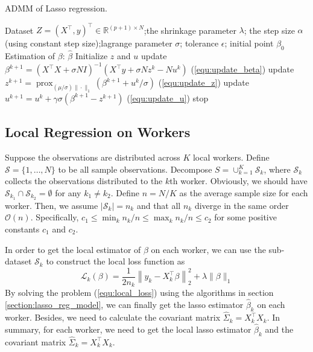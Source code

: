 \documentclass[11pt,en,authoryear]{elegantpaper}
\numberwithin{equation}{section}
\newcommand{\mbR}{\mathbb{R}}
\newcommand{\mS}{\mathcal{S}}
\begin{document}
\begin{center}
\begin{minipage}{13.5cm}
	  \begin{algorithm}[H]
  \caption{ADMM of Lasso regression.}\label{algo:admm_lasso}
  \begin{algorithmic}[1]
    \Require
      Dataset $Z = (X^{\top}, y)^{\top} \in \mbR^{(p+1) \times N}$;the shrinkage parameter $\lambda$;  the step size $\alpha$ (using constant step size);lagrange parameter $\sigma$; tolerance $\epsilon$; initial point $\beta_0$
    \Ensure Estimation of $\beta$: $\hat{\beta}$
    \State Initialize $z$ and $u$
    {
    \State update $\beta^{k+1}=\left(X^{\top} X+\sigma N  I\right)^{-1}\left(X^{\top} y+\sigma N z^{k}- N u^{k}\right)$ \quad (\ref{equ:update_beta})
    \State update $z^{k+1}=\operatorname{prox}_{(\mu / \sigma)\|\cdot\|_{1}}\left({\beta}^{k+1}+u^{k} / \sigma\right)$ \quad (\ref{equ:update_z})
    \State update $u^{k+1}=u^{k}+\gamma \sigma\left({\beta}^{k+1}-z^{k+1}\right)$ \quad (\ref{equ:update_u})
    \State stop
    \EndIf
    }
    \EndFor
  \end{algorithmic}
\end{algorithm}
\end{minipage}
\end{center}

\subsection{Local Regression on Workers}
Suppose the observations are distributed across $K$ local workers. Define $\mS = \{1,\ldots,N\}$ to be all sample observations. Decompose $S=\cup_{k=1}^{K} \mathcal{S}_{k}$, where $\mS_k$ collects the observations distributed to the $k$th worker. Obviously, we should have $\mathcal{S}_{k_{1}} \cap \mathcal{S}_{k_{2}}=\emptyset$ for any $k_{1} \neq k_{2}$. Define $n = N/K$ as the average sample size for each worker. Then, we assume $\left|\mathcal{S}_{k}\right|=n_{k}$ and that all $n_k$ diverge in the same order $\mathcal{O}(n)$. Specifically, $c_{1} \leq \min _{k} n_{k} / n \leq \max _{k} n_{k} / n \leq c_{2}$ for some positive constants $c_1$ and $c_2$.

In order to get the local estimator of $\beta$ on each worker, we can use the sub-dataset $\mS_k$ to construct the local loss function as 
\begin{equation}\label{equ:local_loss}
    \mathcal{L}_k(\beta) = \frac{1}{2n_k} \left\|y_{k} - X_k^{\top}\beta \right\|_2^2 + \lambda \|\beta \|_1
\end{equation}
By solving the problem (\ref{equ:local_loss}) using the algorithms in section \ref{section:lasso_reg_model}, we can finally get the lasso estimator $\hat{\beta}_k$ on each worker. Besides, we need to calculate the covariant matrix $\hat{\Sigma}_k = X_k^{\top}X_k$. In summary, for each worker, we need to get the local lasso estimator $\hat{\beta}_k$ and the covariant matrix $\hat{\Sigma}_k = X_k^{\top}X_k$.
\end{document}
